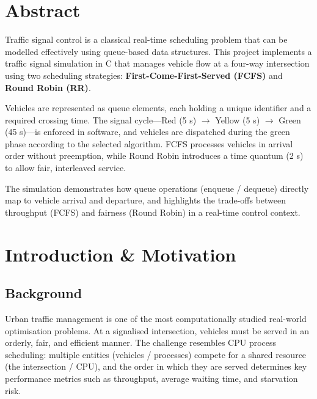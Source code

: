 \documentclass[12pt,a4paper]{article}
\begin{document}
\newpage
\tableofcontents
\newpage

\section*{Abstract}

Traffic signal control is a classical real-time scheduling problem that can be modelled effectively using queue-based data structures. This project implements a traffic signal simulation in C that manages vehicle flow at a four-way intersection using two scheduling strategies: \textbf{First-Come-First-Served (FCFS)} and \textbf{Round Robin (RR)}. 

Vehicles are represented as queue elements, each holding a unique identifier and a required crossing time. The signal cycle—Red (5 s) $\rightarrow$ Yellow (5 s) $\rightarrow$ Green (45 s)—is enforced in software, and vehicles are dispatched during the green phase according to the selected algorithm. FCFS processes vehicles in arrival order without preemption, while Round Robin introduces a time quantum (2 s) to allow fair, interleaved service.

The simulation demonstrates how queue operations (enqueue / dequeue) directly map to vehicle arrival and departure, and highlights the trade-offs between throughput (FCFS) and fairness (Round Robin) in a real-time control context.

\newpage

\section{Introduction \& Motivation}

\subsection{Background}
Urban traffic management is one of the most computationally studied real-world optimisation problems. At a signalised intersection, vehicles must be served in an orderly, fair, and efficient manner. The challenge resembles CPU process scheduling: multiple entities (vehicles / processes) compete for a shared resource (the intersection / CPU), and the order in which they are served determines key performance metrics such as throughput, average waiting time, and starvation risk.
\end{document}
